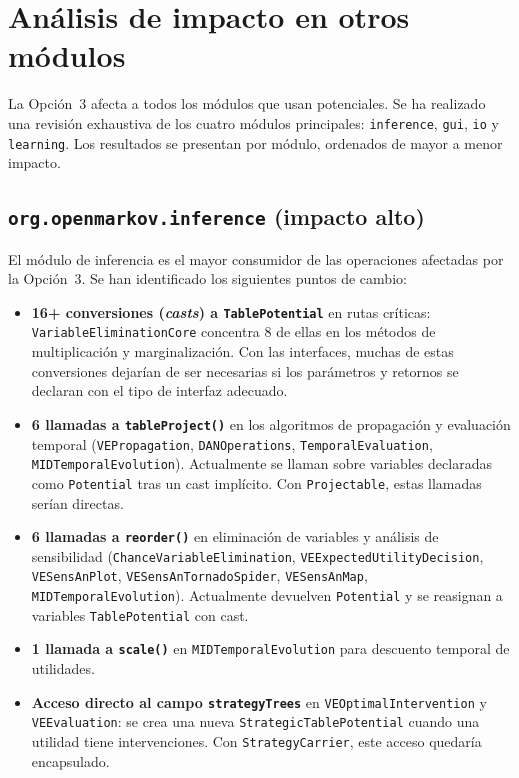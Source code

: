 \documentclass[11pt,a4paper]{article}
\newcommand{\code}[1]{\texttt{#1}}
\begin{document}
\section{Análisis de impacto en otros módulos}
\label{sec:op3-impacto}

La Opción~3 afecta a todos los módulos que usan potenciales.  Se ha realizado
una revisión exhaustiva de los cuatro módulos principales: \code{inference},
\code{gui}, \code{io} y \code{learning}.  Los resultados se presentan por módulo,
ordenados de mayor a menor impacto.

\subsection{\code{org.openmarkov.inference} (impacto alto)}
\label{sec:op3-inference}

El módulo de inferencia es el mayor consumidor de las operaciones afectadas
por la Opción~3.  Se han identificado los siguientes puntos de cambio:

\begin{itemize}
  \item \textbf{16+ conversiones (\emph{casts}) a \code{TablePotential}} en rutas
        críticas: \code{VariableEliminationCore} concentra 8 de ellas en los
        métodos de multiplicación y marginalización.  Con las interfaces,
        muchas de estas conversiones dejarían de ser necesarias si los parámetros
        y retornos se declaran con el tipo de interfaz adecuado.

  \item \textbf{6 llamadas a \code{tableProject()}} en los algoritmos de propagación
        y evaluación temporal (\code{VEPropagation}, \code{DANOperations},
        \code{TemporalEvaluation}, \code{MIDTemporalEvolution}).  Actualmente se
        llaman sobre variables declaradas como \code{Potential} tras un cast
        implícito.  Con \code{Projectable}, estas llamadas serían directas.

  \item \textbf{6 llamadas a \code{reorder()}} en eliminación de variables y
        análisis de sensibilidad (\code{Chance\-Variable\-Elimination},
        \code{VE\-Expected\-Utility\-Decision}, \code{VESensAnPlot},
        \code{VE\-Sens\-An\-Tornado\-Spider}, \code{VESensAnMap},
        \code{MID\-Temporal\-Evolution}).  Actualmente devuelven \code{Potential}
        y se reasignan a variables \code{TablePotential} con cast.

  \item \textbf{1 llamada a \code{scale()}} en \code{MIDTemporalEvolution} para
        descuento temporal de utilidades.

  \item \textbf{Acceso directo al campo \code{strategyTrees}} en
        \code{VEOptimalIntervention} y \code{VEEvaluation}: se crea una nueva
        \code{StrategicTablePotential} cuando una utilidad tiene intervenciones.
        Con \code{StrategyCarrier}, este acceso quedaría encapsulado.
\end{itemize}
\end{document}
